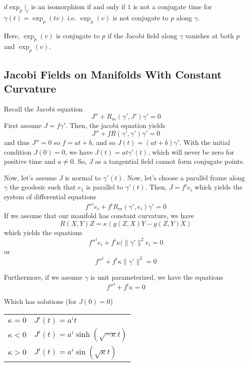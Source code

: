 \documentclass[../main.tex]{subfiles}
\begin{document}
\begin{theorem}
    $d\exp_p|_v$ is an isomorphism if and only if $1$ is not a conjugate time
    for $\gamma(t) = \exp_p(tv)$ i.e. $\exp_p(v)$ is not conjugate to $p$ along
    $\gamma$.
\end{theorem}
Here, $\exp_p(v)$ is conjugate to $p$ if the Jacobi field along $\gamma$
vanishes at both $p$ and $\exp_p(v)$.

\subsection{Jacobi Fields on Manifolds With Constant Curvature}
Recall the Jacobi equation
\begin{equation}
    J'' + R_m(\gamma',J')\gamma' = 0
\end{equation}
First assume $J = f\gamma'$. Then, the jacobi equation yields
\begin{equation}
    J'' + fR(\gamma',\gamma')\gamma' = 0
\end{equation}
and thus $J''=0$ so $f = at+b$, and so $J(t) = (at+b)\gamma'$. With the initial
condition $J(0)=0$, we have $J(t) = at\gamma'(t)$, which will never be zero for
positive time and $a\neq 0$. So, $J$ as a tangential field cannot form conjugate
points.

Now, let's assume $J$ is normal to $\gamma'(t)$. Now, let's choose a parallel
frame along $\gamma$ the geodesic such that $e_1$ is parallel to $\gamma'(t)$.
Then, $J = f^ie_i$ which yields the system of differential equations
\begin{equation}
    f''^ie_i + f^iR_m(\gamma',e_i)\gamma' = 0
\end{equation}
If we assume that our manifold has constant curvature, we have
\begin{equation}
    R(X,Y)Z = \kappa(g(Z,X)Y - g(Z,Y)X)
\end{equation}
which yields the equations
\begin{equation}
    f''^ie_i + f^i\kappa(\|\gamma'\|^2e_i = 0
\end{equation}
or
\begin{equation}
    f''^i + f^i\kappa\|\gamma'\|^2 = 0
\end{equation}

Furthermore, if we assume $\gamma$ is unit  parameterized, we have the
equations
\begin{equation}
    f''^i + f^i\kappa = 0
\end{equation}

Which has solutions (for $J(0)=0$)
\begin{table}
    \centering
    \begin{tabular}{l l}
        $\kappa = 0$ & $J^i(t) = a^it$\\
        $\kappa < 0$ & $J^i(t) = a^i\sinh(\sqrt{-\kappa}t)$\\
        $\kappa > 0$ & $J^i(t) = a^i\sin(\sqrt{\kappa}t)$
    \end{tabular}
\end{table}
\end{document}

